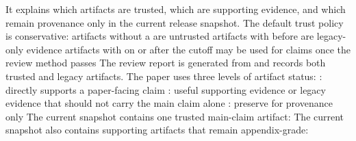 {}It explains which artifacts are trusted, which are supporting evidence, and which remain provenance only in the current release snapshot.\markdownRendererInterblockSeparator
{}\markdownRendererSectionBegin
{}\markdownRendererInterblockSeparator
{}The default trust policy is conservative:\markdownRendererInterblockSeparator
{}\markdownRendererUlBeginTight
\markdownRendererUlItem artifacts without a  are untrusted\markdownRendererUlItemEnd 
\markdownRendererUlItem artifacts with  before  are legacy-only evidence\markdownRendererUlItemEnd 
\markdownRendererUlItem artifacts with  on or after the cutoff may be used for claims once the review method passes\markdownRendererUlItemEnd 
\markdownRendererUlEndTight \markdownRendererInterblockSeparator
{}The review report is generated from  and records both trusted and legacy artifacts.\markdownRendererInterblockSeparator
{}
\markdownRendererSectionEnd \markdownRendererSectionBegin
{}\markdownRendererInterblockSeparator
{}The paper uses three levels of artifact status:\markdownRendererInterblockSeparator
{}\markdownRendererUlBeginTight
\markdownRendererUlItem {}: directly supports a paper-facing claim\markdownRendererUlItemEnd 
\markdownRendererUlItem {}: useful supporting evidence or legacy evidence that should not carry the main claim alone\markdownRendererUlItemEnd 
\markdownRendererUlItem {}: preserve for provenance only\markdownRendererUlItemEnd 
\markdownRendererUlEndTight \markdownRendererInterblockSeparator
{}The current snapshot contains one trusted main-claim artifact:\markdownRendererInterblockSeparator
{}\markdownRendererUlBeginTight
\markdownRendererUlItem {}\markdownRendererUlItemEnd 
\markdownRendererUlEndTight \markdownRendererInterblockSeparator
{}The current snapshot also contains supporting artifacts that remain appendix-grade:\markdownRendererInterblockSeparator
{}\markdownRendererUlBeginTight
\markdownRendererUlItem {}\markdownRendererUlItemEnd 
